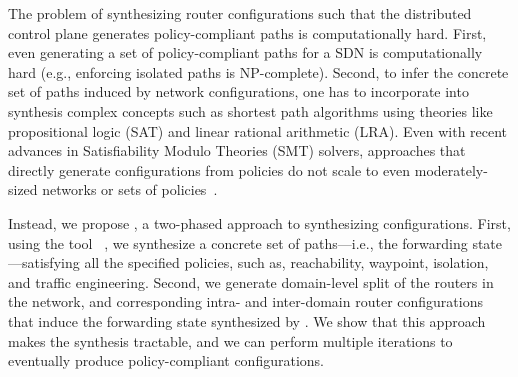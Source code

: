 

The problem of synthesizing router configurations
such that the distributed control plane  
generates policy-compliant paths 
is computationally hard. 
First, even generating a set of policy-compliant 
paths for a SDN  is 
computationally hard (e.g., enforcing isolated
paths is NP-complete). 
Second, to infer the concrete
set of paths induced by network configurations, 
one has to incorporate
into synthesis
complex concepts such as shortest path algorithms
using theories like propositional logic (SAT) 
and linear rational
arithmetic (LRA). Even with recent 
advances in Satisfiability Modulo Theories
(SMT) solvers, 
approaches that directly generate configurations  from policies
do not scale to
even moderately-sized networks or 
sets of policies~\cite{synet}.


Instead, we propose \name, a two-phased approach to synthesizing
configurations.  First, using the tool \genesis~\cite{genesis}, we synthesize a
concrete set of paths---i.e., the forwarding state---satisfying all
the specified policies, such as, reachability, waypoint, isolation,
and traffic engineering.
Second, we generate
domain-level split of the routers in the network,
and corresponding 
intra- and inter-domain router configurations
that induce the forwarding
state synthesized by \genesis. We show that this approach makes the synthesis tractable, and we can
perform multiple iterations to eventually produce policy-compliant
configurations.

